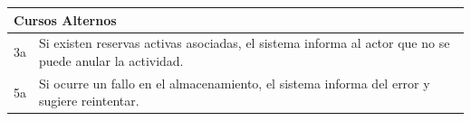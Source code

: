     \begin{table}[H]
        \begin{tabular}{llllllll}
        \hline
        \multicolumn{8}{|l|}{\cellcolor[HTML]{F2F2F2}Cursos Alternos}                                                                                                                                                                                                                                                                                \\ \hline
        \multicolumn{1}{|c|}{3a} & \multicolumn{7}{p{15cm}|}{{\color[HTML]{808080} Si existen reservas activas asociadas, el sistema informa al actor que no se puede anular la actividad.}}                                                                                                                                      \\ \hline
        \multicolumn{1}{|c|}{5a} & \multicolumn{7}{p{15cm}|}{{\color[HTML]{808080} Si ocurre un fallo en el almacenamiento, el sistema informa del error y sugiere reintentar.}}                                                                                                                                      \\ \hline
        \end{tabular}
    \end{table}

